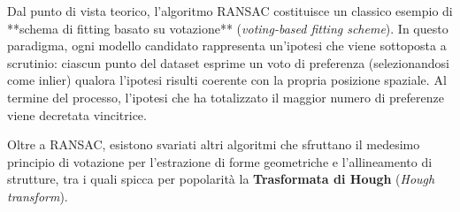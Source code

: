 ﻿\documentclass[11pt, a4paper]{article}
\begin{document}
Dal punto di vista teorico, l'algoritmo RANSAC costituisce un classico esempio di **schema di fitting basato su votazione** (\emph{voting-based fitting scheme}). In questo paradigma, ogni modello candidato rappresenta un'ipotesi che viene sottoposta a scrutinio: ciascun punto del dataset esprime un voto di preferenza (selezionandosi come inlier) qualora l'ipotesi risulti coerente con la propria posizione spaziale. Al termine del processo, l'ipotesi che ha totalizzato il maggior numero di preferenze viene decretata vincitrice.

Oltre a RANSAC, esistono svariati altri algoritmi che sfruttano il medesimo principio di votazione per l'estrazione di forme geometriche e l'allineamento di strutture, tra i quali spicca per popolarità la \textbf{Trasformata di Hough} (\emph{Hough transform}).
\end{document}
